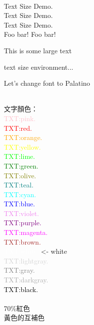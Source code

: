 \documentclass[12pt]{article}
\begin{document}
\begin{CJK*}{UTF8}{bkai}
	\noindent\mbox{}\\
	{\fontsize{22}{\baselineskip}\selectfont Text Size Demo.\\}
	{\fontsize{23}{\baselineskip}\selectfont Text Size Demo.\\}
	{\fontsize{24}{\baselineskip}\selectfont Text Size Demo.\\}
	{\fontsize{50}{60}\selectfont Foo}
	{\fontsize{5}{6}\selectfont bar!}
	{\Huge Foo}
	{\tiny bar!}
	{\Large This is some large text\par}
	\begin{footnotesize}
		text size environment...
	\end{footnotesize}

	Let's change font to {\selectfont Palatino} %
	
	\noindent\mbox{}\\
	文字顏色：\\
	{\textcolor{pink}{TXT:pink.}} \\
	{\textcolor{red}{TXT:red.}} \\
	{\textcolor{orange}{TXT:orange.}} \\
	{\textcolor{yellow}{TXT:yellow.}} \\
	{\textcolor{lime}{TXT:lime.}} \\
	{\textcolor{green}{TXT:green.}} \\
	{\textcolor{olive}{TXT:olive.}} \\
	{\textcolor{teal}{TXT:teal.}} \\
	{\textcolor{cyan}{TXT:cyan.}} \\
	{\textcolor{blue}{TXT:blue.}} \\
	{\textcolor{violet}{TXT:violet.}} \\
	{\textcolor{purple}{TXT:purple.}} \\
	{\textcolor{magenta}{TXT:magenta.}} \\
	{\textcolor{brown}{TXT:brown.}} \\
	{\textcolor{white}{TXT:white.}} \textless- white\\
	{\textcolor{lightgray}{TXT:lightgray.}} \\
	{\textcolor{gray}{TXT:gray.}} \\
	{\textcolor{darkgray}{TXT:darkgray.}} \\
	{\textcolor{black}{TXT:black.}} \\
	\mbox{}\\
	{\textcolor{red!70}{70\%紅色}} \\
	{\textcolor{-yellow}{黃色的互補色}} \\
	

\end{CJK*}
\end{document}
